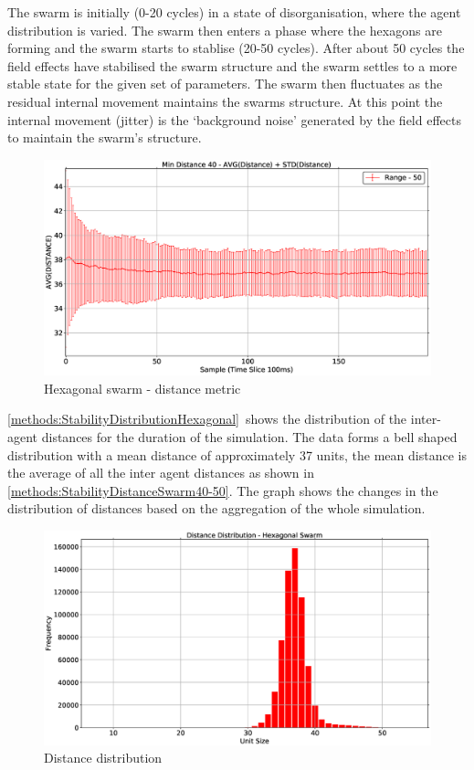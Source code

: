 The swarm is initially (0-20 cycles) in a state of disorganisation, where the agent distribution is varied. The swarm then enters a phase where the hexagons are forming and the swarm starts to stablise (20-50 cycles). After about 50 cycles the field effects have stabilised the swarm structure and the swarm settles to a more stable state for the given set of parameters. The swarm then fluctuates as the residual internal movement maintains the swarms structure. At this point the internal movement (jitter) is the `background noise' generated by the field effects to maintain the swarm's structure.

\begin{figure}[H]
\begin{center}
\includegraphics[width=13cm]{CHAPTER-5/figures/StabilityDistanceSwarm40-50}
\end{center}
\caption{Hexagonal swarm - distance metric\label{methods:StabilityDistanceSwarm40-50}}
\end{figure}

\autoref{methods:StabilityDistributionHexagonal}~shows the distribution of the inter-agent distances for the duration of the simulation. The data forms a bell shaped distribution with a mean distance of approximately 37 units, the mean distance is the average of all the inter agent distances as shown in \autoref{methods:StabilityDistanceSwarm40-50}. The graph shows the changes in the distribution of distances based on the aggregation of the whole simulation. 
\begin{figure}[H]
\begin{center}
\includegraphics[width=13cm]{CHAPTER-5/figures/StabilityDistibutionHexagonal}
\end{center}
\caption{Distance distribution\label{methods:StabilityDistributionHexagonal}}
\end{figure}

